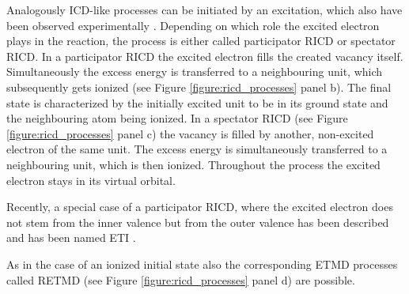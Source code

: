 Analogously ICD-like
processes can be initiated by an excitation, which also have been observed
experimentally \cite{Barth05,Gokhberg06,Kopelke09}.
Depending on which role the excited
electron plays in the reaction, the process is either called participator \ac{RICD}
or spectator \ac{RICD}.
In a participator \ac{RICD} the excited electron fills the created vacancy itself.
Simultaneously the excess energy is transferred to a neighbouring unit, which
subsequently gets ionized (see Figure \ref{figure:ricd_processes} panel b).
The final state is characterized
by the initially excited unit to be in its ground state and the neighbouring atom
being ionized.
In a spectator \ac{RICD} (see Figure \ref{figure:ricd_processes} panel c)
the vacancy is filled by another, non-excited electron
of the same unit. The excess energy is simultaneously transferred to a neighbouring
unit, which is then ionized. Throughout the process the excited electron stays
in its virtual orbital.

Recently, a special case of a participator \ac{RICD}, where the excited
electron does not stem from the inner valence but from the outer valence
has been described and has been named \ac{ETI} \cite{Kopelke11}.

As in the case of an ionized initial state also the corresponding ETMD processes
called RETMD (see Figure \ref{figure:ricd_processes} panel d) are possible.




